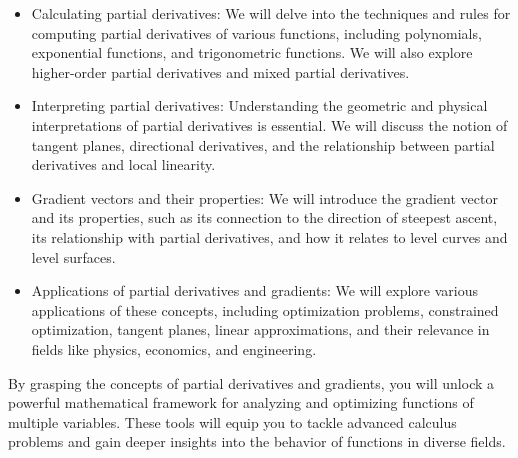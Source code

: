\begin{itemize}
\item Calculating partial derivatives: We will delve into the techniques and rules for computing partial derivatives of various functions, including polynomials, exponential functions, and trigonometric functions. We will also explore higher-order partial derivatives and mixed partial derivatives.

\item Interpreting partial derivatives: Understanding the geometric and physical interpretations of partial derivatives is essential. We will discuss the notion of tangent planes, directional derivatives, and the relationship between partial derivatives and local linearity.

\item Gradient vectors and their properties: We will introduce the gradient vector and its properties, such as its connection to the direction of steepest ascent, its relationship with partial derivatives, and how it relates to level curves and level surfaces.

\item Applications of partial derivatives and gradients: We will explore various applications of these concepts, including optimization problems, constrained optimization, tangent planes, linear approximations, and their relevance in fields like physics, economics, and engineering.
\end{itemize}

By grasping the concepts of partial derivatives and gradients, you will unlock a powerful mathematical framework for analyzing and optimizing functions of multiple variables. These tools will equip you to tackle advanced calculus problems and gain deeper insights into the behavior of functions in diverse fields.